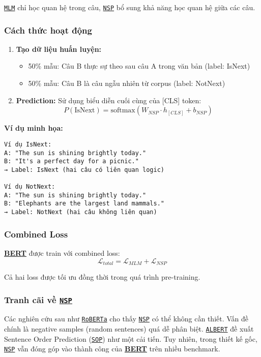 \hyperref[acro:mlm]{\texttt{MLM}} chỉ học quan hệ trong câu, \hyperref[acro:nsp]{\texttt{NSP}} bổ sung khả năng học quan hệ giữa các câu.

\subsubsection{Cách thức hoạt động}
\begin{enumerate}
    \item \textbf{Tạo dữ liệu huấn luyện:}
    \begin{itemize}
        \item 50\% mẫu: Câu B thực sự theo sau câu A trong văn bản (label: IsNext)
        \item 50\% mẫu: Câu B là câu ngẫu nhiên từ corpus (label: NotNext)
    \end{itemize}
    
    \item \textbf{Prediction:} Sử dụng biểu diễn cuối cùng của [CLS] token:
    \begin{equation}
    P(\text{IsNext}) = \text{softmax}(W_{NSP} \cdot h_{[CLS]} + b_{NSP})
    \label{eq:nsp_prediction}
    \end{equation}
\end{enumerate}

\textbf{Ví dụ minh họa:}
\begin{verbatim}
Ví dụ IsNext:
A: "The sun is shining brightly today."
B: "It's a perfect day for a picnic."
→ Label: IsNext (hai câu có liên quan logic)

Ví dụ NotNext:
A: "The sun is shining brightly today."
B: "Elephants are the largest land mammals."
→ Label: NotNext (hai câu không liên quan)
\end{verbatim}

\subsubsection{Combined Loss}
\hyperref[acro:bert]{\textbf{BERT}} được train với combined loss:
\begin{equation}
\mathcal{L}_{total} = \mathcal{L}_{MLM} + \mathcal{L}_{NSP}
\label{eq:combined_loss}
\end{equation}

Cả hai loss được tối ưu đồng thời trong quá trình pre-training.

\subsubsection{Tranh cãi về \hyperref[acro:nsp]{\texttt{NSP}}}
Các nghiên cứu sau như \hyperref[acro:roberta]{\texttt{RoBERTa}} \cite{liu2019roberta} cho thấy \hyperref[acro:nsp]{\texttt{NSP}} có thể không cần thiết. Vấn đề chính là negative samples (random sentences) quá dễ phân biệt. \hyperref[acro:albert]{\texttt{ALBERT}} \cite{lan2019albert} đề xuất Sentence Order Prediction (\hyperref[acro:sop]{\texttt{SOP}}) như một cải tiến. Tuy nhiên, trong thiết kế gốc, \hyperref[acro:nsp]{\texttt{NSP}} vẫn đóng góp vào thành công của \hyperref[acro:bert]{\textbf{BERT}} trên nhiều benchmark.

